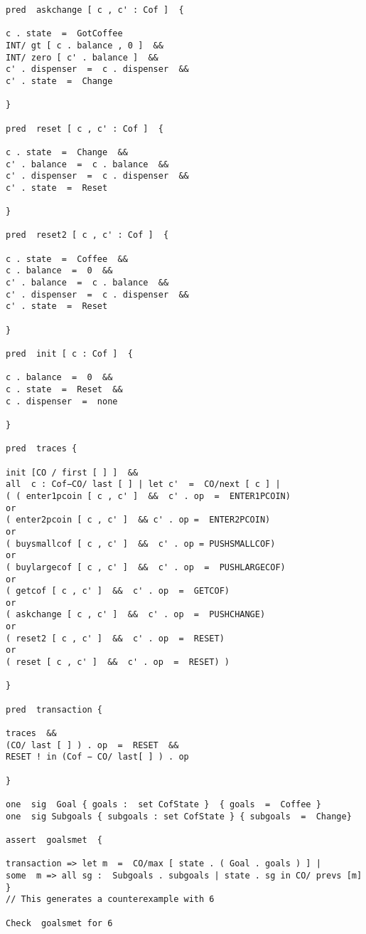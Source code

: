 \documentclass[a4paper,12pt]{extarticle}
\begin{document}
\begin{verbatim}
pred  askchange [ c , c' : Cof ]  {

c . state  =  GotCoffee
INT/ gt [ c . balance , 0 ]  &&
INT/ zero [ c' . balance ]  &&
c' . dispenser  =  c . dispenser  &&
c' . state  =  Change

}

pred  reset [ c , c' : Cof ]  {

c . state  =  Change  &&
c' . balance  =  c . balance  &&
c' . dispenser  =  c . dispenser  &&
c' . state  =  Reset

}

pred  reset2 [ c , c' : Cof ]  {

c . state  =  Coffee  &&
c . balance  =  0  &&
c' . balance  =  c . balance  &&
c' . dispenser  =  c . dispenser  &&
c' . state  =  Reset

}

pred  init [ c : Cof ]  {

c . balance  =  0  &&
c . state  =  Reset  &&
c . dispenser  =  none

}

pred  traces {

init [CO / first [ ] ]  &&
all  c : Cof−CO/ last [ ] | let c'  =  CO/next [ c ] |
( ( enter1pcoin [ c , c' ]  &&  c' . op  =  ENTER1PCOIN)
or
( enter2pcoin [ c , c' ]  && c' . op =  ENTER2PCOIN)
or
( buysmallcof [ c , c' ]  &&  c' . op = PUSHSMALLCOF)
or
( buylargecof [ c , c' ]  &&  c' . op  =  PUSHLARGECOF)
or
( getcof [ c , c' ]  &&  c' . op  =  GETCOF)
or
( askchange [ c , c' ]  &&  c' . op  =  PUSHCHANGE)
or
( reset2 [ c , c' ]  &&  c' . op  =  RESET)
or
( reset [ c , c' ]  &&  c' . op  =  RESET) )

}

pred  transaction {

traces  &&
(CO/ last [ ] ) . op  =  RESET  &&
RESET ! in (Cof − CO/ last[ ] ) . op

}

one  sig  Goal { goals :  set CofState }  { goals  =  Coffee }
one  sig Subgoals { subgoals : set CofState } { subgoals  =  Change}

assert  goalsmet  {

transaction => let m  =  CO/max [ state . ( Goal . goals ) ] |
some  m => all sg :  Subgoals . subgoals | state . sg in CO/ prevs [m]
}
// This generates a counterexample with 6

Check  goalsmet for 6

\end{verbatim}
\newpage
\end{document}
